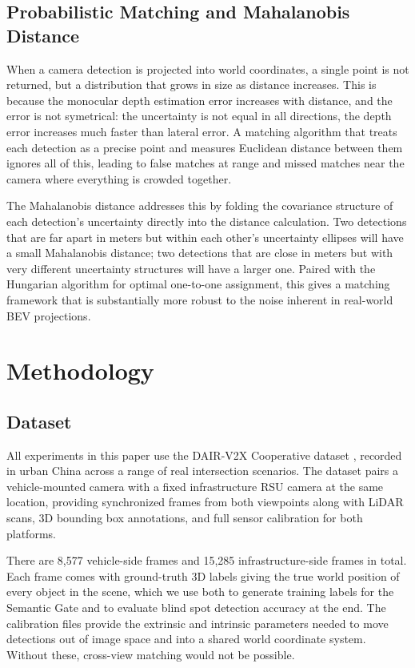 \documentclass[12pt]{article}
\begin{document}
\subsection{Probabilistic Matching and Mahalanobis Distance}

When a camera detection is projected into world coordinates, a single point is not returned, but a distribution that grows in size as distance increases. This is because the monocular depth estimation error increases with distance, and the error is not symetrical: the uncertainty is not equal in all directions, the depth error increases much faster than lateral error. A matching algorithm that treats each detection as a precise point and measures Euclidean distance between them ignores all of this, leading to false matches at range and missed matches near the camera where everything is crowded together.

\medskip
The Mahalanobis distance \cite{mahalanobis1936} addresses this by folding the covariance structure of each detection's uncertainty directly into the distance calculation. Two detections that are far apart in meters but within each other's uncertainty ellipses will have a small Mahalanobis distance; two detections that are close in meters but with very different uncertainty structures will have a larger one. Paired with the Hungarian algorithm \cite{kuhn1955hungarian} for optimal one-to-one assignment, this gives a matching framework that is substantially more robust to the noise inherent in real-world BEV projections.

\section{Methodology}
\label{sec:method}

\subsection{Dataset}

All experiments in this paper use the DAIR-V2X Cooperative dataset \cite{yu2022dairv2x}, recorded in urban China across a range of real intersection scenarios. The dataset pairs a vehicle-mounted camera with a fixed infrastructure RSU camera at the same location, providing synchronized frames from both viewpoints along with LiDAR scans, 3D bounding box annotations, and full sensor calibration for both platforms.

\medskip
There are 8,577 vehicle-side frames and 15,285 infrastructure-side frames in total. Each frame comes with ground-truth 3D labels giving the true world position of every object in the scene, which we use both to generate training labels for the Semantic Gate and to evaluate blind spot detection accuracy at the end. The calibration files provide the extrinsic and intrinsic parameters needed to move detections out of image space and into a shared world coordinate system. Without these, cross-view matching would not be possible.
\end{document}
